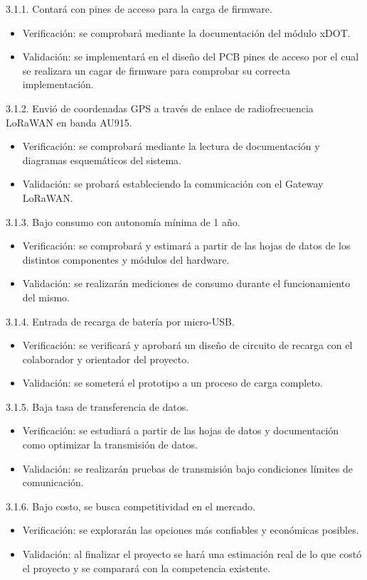 \documentclass[11pt]{charter}
\begin{document}
3.1.1. Contará con pines de acceso para la carga de firmware.
\begin{itemize}
	\item Verificación: se comprobará mediante la documentación del módulo xDOT. 
	\item Validación: se implementará en el diseño del PCB pines de acceso por el cual se realizara un cagar de firmware para comprobar su correcta implementación. 
\end{itemize}

3.1.2. Envió de coordenadas GPS a través de enlace de radiofrecuencia LoRaWAN en banda AU915.
\begin{itemize}
	\item Verificación: se comprobará mediante la lectura de documentación y diagramas esquemáticos del sistema. 
	\item Validación: se probará estableciendo la comunicación con el Gateway LoRaWAN.  
\end{itemize}

3.1.3. Bajo consumo con autonomía mínima de 1 año.
\begin{itemize}
	\item Verificación: se comprobará y estimará a partir de las hojas de datos de los distintos componentes y módulos del hardware. 
	\item Validación: se realizarán mediciones de consumo durante el funcionamiento del mismo. 
\end{itemize}

3.1.4. Entrada de recarga de batería por micro-USB.
\begin{itemize}
	\item Verificación: se verificará y aprobará un diseño de circuito de recarga con el colaborador y orientador del proyecto. 
	\item Validación: se someterá el prototipo a un proceso de carga completo. 
\end{itemize}

3.1.5. Baja tasa de transferencia de datos. 
\begin{itemize}
	\item Verificación: se estudiará a partir de las hojas de datos y documentación como optimizar la transmisión de datos. 
	\item Validación: se realizarán pruebas de transmisión bajo condiciones límites de comunicación. 
\end{itemize}

3.1.6. Bajo costo, se busca competitividad en el mercado.
\begin{itemize}
	\item Verificación: se explorarán las opciones más confiables y económicas posibles. 
	\item Validación: al finalizar el proyecto se hará una estimación real de lo que costó el proyecto y se comparará con la competencia existente. 
\end{itemize}
\end{document}
